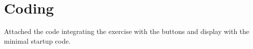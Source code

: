 \section{Coding}

Attached the code integrating the exercise with the buttons and display with the minimal startup code.
